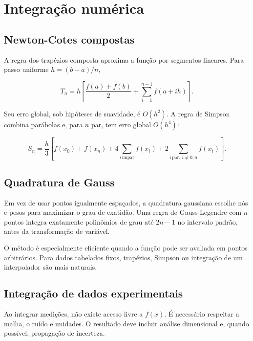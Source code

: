 \documentclass[12pt,a4paper,openany]{book}
\begin{document}
\chapter{Integração numérica}



\section{Newton-Cotes compostas}



A regra dos trapézios composta aproxima a função por segmentos lineares. Para passo uniforme $h=(b-a)/n$,



\[T_n=h\left[\frac{f(a)+f(b)}{2}+\sum_{i=1}^{n-1}f(a+ih)\right].\]



Seu erro global, sob hipóteses de suavidade, é $O(h^2)$. A regra de Simpson combina parábolas e, para $n$ par, tem erro global $O(h^4)$:



\[S_n=\frac{h}{3}\left[f(x_0)+f(x_n)+4\sum_{i\,\text{ímpar}}f(x_i)+2\sum_{i\,\text{par},\,i\ne0,n}f(x_i)\right].\]



\section{Quadratura de Gauss}



Em vez de usar pontos igualmente espaçados, a quadratura gaussiana escolhe nós e pesos para maximizar o grau de exatidão. Uma regra de Gauss-Legendre com $n$ pontos integra exatamente polinômios de grau até $2n-1$ no intervalo padrão, antes da transformação de variável.



O método é especialmente eficiente quando a função pode ser avaliada em pontos arbitrários. Para dados tabelados fixos, trapézios, Simpson ou integração de um interpolador são mais naturais.



\section{Integração de dados experimentais}



Ao integrar medições, não existe acesso livre a $f(x)$. É necessário respeitar a malha, o ruído e unidades. O resultado deve incluir análise dimensional e, quando possível, propagação de incerteza.
\end{document}
